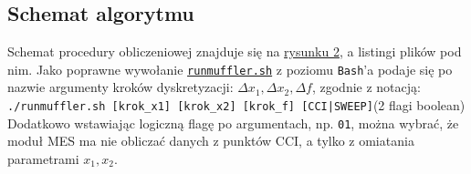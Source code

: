 \documentclass{sprawozdanie-agh}
\begin{document}
\subsection{Schemat algorytmu}
\par Schemat procedury obliczeniowej znajduje się na \hyperref[rysunek2]{rysunku 2}, a listingi plików pod nim. Jako poprawne wywołanie \texttt{\hyperref[list1]{runmuffler.sh}} z poziomu \texttt{Bash}'a podaje się po nazwie argumenty kroków dyskretyzacji: $\Delta x_1, \Delta x_2, \Delta f$, zgodnie z notacją:\\
\texttt{./runmuffler.sh [krok\_x1] [krok\_x2] [krok\_f] [CCI|SWEEP]}(2 flagi boolean)\\
Dodatkowo wstawiając logiczną flagę po argumentach, np. \texttt{01}, można wybrać, że moduł MES ma nie obliczać danych z punktów CCI, a tylko z omiatania parametrami $x_1,x_2$.
\end{document}
